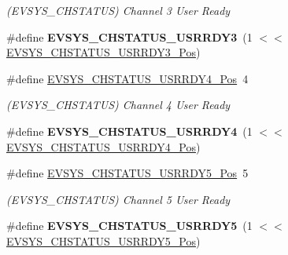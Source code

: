 \begin{DoxyCompactItemize}
\begin{DoxyCompactList}\small\item\em (E\+V\+S\+Y\+S\+\_\+\+C\+H\+S\+T\+A\+T\+U\+S) Channel 3 User Ready \end{DoxyCompactList}\item 
\hypertarget{group___s_a_m_l21___e_v_s_y_s_ga768229bbe19fa55f5b415de981e8d38b}{}\#define {\bfseries E\+V\+S\+Y\+S\+\_\+\+C\+H\+S\+T\+A\+T\+U\+S\+\_\+\+U\+S\+R\+R\+D\+Y3}~(1 $<$$<$ \hyperlink{group___s_a_m_l21___e_v_s_y_s_gaadc4166c437dd04d3bbebda33e9c1b0e}{E\+V\+S\+Y\+S\+\_\+\+C\+H\+S\+T\+A\+T\+U\+S\+\_\+\+U\+S\+R\+R\+D\+Y3\+\_\+\+Pos})\label{group___s_a_m_l21___e_v_s_y_s_ga768229bbe19fa55f5b415de981e8d38b}

\item 
\hypertarget{group___s_a_m_l21___e_v_s_y_s_gaceb6034b235b555a339b73d43f8cb131}{}\#define \hyperlink{group___s_a_m_l21___e_v_s_y_s_gaceb6034b235b555a339b73d43f8cb131}{E\+V\+S\+Y\+S\+\_\+\+C\+H\+S\+T\+A\+T\+U\+S\+\_\+\+U\+S\+R\+R\+D\+Y4\+\_\+\+Pos}~4\label{group___s_a_m_l21___e_v_s_y_s_gaceb6034b235b555a339b73d43f8cb131}

\begin{DoxyCompactList}\small\item\em (E\+V\+S\+Y\+S\+\_\+\+C\+H\+S\+T\+A\+T\+U\+S) Channel 4 User Ready \end{DoxyCompactList}\item 
\hypertarget{group___s_a_m_l21___e_v_s_y_s_gab02e201ca0df582b917de4899f071e1e}{}\#define {\bfseries E\+V\+S\+Y\+S\+\_\+\+C\+H\+S\+T\+A\+T\+U\+S\+\_\+\+U\+S\+R\+R\+D\+Y4}~(1 $<$$<$ \hyperlink{group___s_a_m_l21___e_v_s_y_s_gaceb6034b235b555a339b73d43f8cb131}{E\+V\+S\+Y\+S\+\_\+\+C\+H\+S\+T\+A\+T\+U\+S\+\_\+\+U\+S\+R\+R\+D\+Y4\+\_\+\+Pos})\label{group___s_a_m_l21___e_v_s_y_s_gab02e201ca0df582b917de4899f071e1e}

\item 
\hypertarget{group___s_a_m_l21___e_v_s_y_s_gaaf955de97c5f6b558e914263bc2bf125}{}\#define \hyperlink{group___s_a_m_l21___e_v_s_y_s_gaaf955de97c5f6b558e914263bc2bf125}{E\+V\+S\+Y\+S\+\_\+\+C\+H\+S\+T\+A\+T\+U\+S\+\_\+\+U\+S\+R\+R\+D\+Y5\+\_\+\+Pos}~5\label{group___s_a_m_l21___e_v_s_y_s_gaaf955de97c5f6b558e914263bc2bf125}

\begin{DoxyCompactList}\small\item\em (E\+V\+S\+Y\+S\+\_\+\+C\+H\+S\+T\+A\+T\+U\+S) Channel 5 User Ready \end{DoxyCompactList}\item 
\hypertarget{group___s_a_m_l21___e_v_s_y_s_gab6f50a61d9c8ff0c18cf2d588e4b2258}{}\#define {\bfseries E\+V\+S\+Y\+S\+\_\+\+C\+H\+S\+T\+A\+T\+U\+S\+\_\+\+U\+S\+R\+R\+D\+Y5}~(1 $<$$<$ \hyperlink{group___s_a_m_l21___e_v_s_y_s_gaaf955de97c5f6b558e914263bc2bf125}{E\+V\+S\+Y\+S\+\_\+\+C\+H\+S\+T\+A\+T\+U\+S\+\_\+\+U\+S\+R\+R\+D\+Y5\+\_\+\+Pos})\label{group___s_a_m_l21___e_v_s_y_s_gab6f50a61d9c8ff0c18cf2d588e4b2258}


\end{DoxyCompactItemize}
